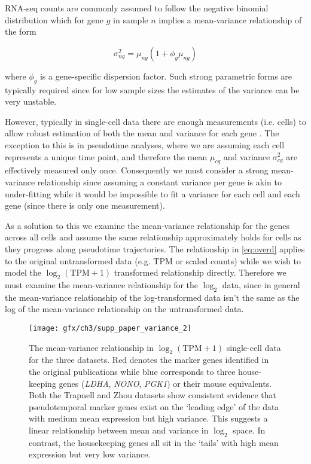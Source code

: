 RNA-seq counts are commonly assumed to follow the negative binomial distribution 
\cite{Anders2010,Love2014-lx,Robinson2010-rj}
which for gene $g$ in sample $n$ implies a mean-variance relationship of the form

\begin{equation} \label{eq:overd}
\sigma_{ng}^2 = \mu_{ng}(1 + \phi_g \mu_{ng})
\end{equation}

where $\phi_g$ is a gene-specific dispersion factor. Such strong parametric forms are typically required since for low sample sizes the estimates of the variance can be very unstable. %

However, typically in single-cell data there are enough measurements (i.e. cells) to allow robust estimation of both the mean and variance for each gene \cite{Finak2015-iy}. The exception to this is in pseudotime analyses, where we are assuming each cell represents a unique time point, and therefore the mean $\mu_{cg}$ and variance $\sigma^2_{cg}$ are effectively measured only once. Consequently we must consider a strong mean-variance relationship since assuming a constant variance per gene is akin to under-fitting while it would be impossible to fit a variance for each cell and each gene (since there is only one measurement).

As a solution to this we examine the mean-variance relationship for the genes across all cells and assume the same relationship approximately holds for cells as they progress along pseudotime trajectories. The relationship in \ref{eq:overd} applies to the original untransformed data (e.g. TPM or scaled counts) while we wish to model the $\log_2(\text{TPM} + 1)$ transformed relationship directly. Therefore we must examine the mean-variance relationship for the $\log_2$ data, since in general the mean-variance relationship of the log-transformed data isn't the same as the log of the mean-variance relationship on the untransformed data.

\begin{figure}
\centering
 \texttt{[image: gfx/ch3/supp\_paper\_variance\_2]}
 \caption[Mean-variance relationship in example datasets.]{The mean-variance relationship in $\log_2(\text{TPM} + 1)$ single-cell data for the three datasets. Red denotes the marker genes identified in the original publications while blue corresponds to three house-keeping genes (\emph{LDHA}, \emph{NONO}, \emph{PGK1}) or their mouse equivalents. Both the Trapnell and Zhou datasets show consistent evidence that pseudotemporal marker genes exist on the `leading edge' of the data with medium mean expression but high variance. This suggests a linear relationship between mean and variance in $\log_2$ space. In contrast, the housekeeping genes all sit in the `tails' with high mean expression but very low variance.} \label{fig:variance}
 \end{figure}

